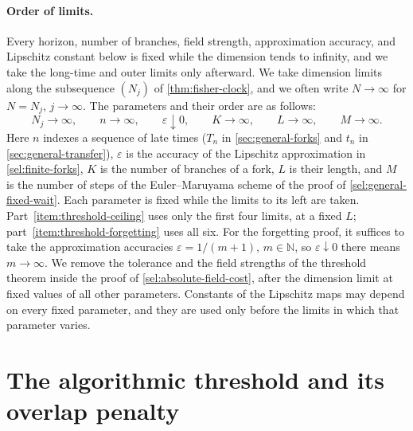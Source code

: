 \paragraph{Order of limits.}
Every horizon, number of branches, field strength, approximation accuracy,
and Lipschitz constant below is fixed while the dimension tends to
infinity, and we take the long-time and outer limits only afterward.
We take dimension limits along the subsequence $(N_j)$ of
\cref{thm:fisher-clock}, and we often write $N\to\infty$ for $N=N_j$,
$j\to\infty$. The parameters and their order are as follows:
\begin{equation}\label{sel:aging-limit-order}
 N_j\to\infty,\qquad n\to\infty,\qquad \varepsilon\downarrow0,\qquad
 K\to\infty,\qquad L\to\infty,\qquad M\to\infty.
\end{equation}
Here $n$ indexes a sequence of late times ($T_n$ in
\cref{sec:general-forks} and $t_n$ in \cref{sec:general-transfer}),
$\varepsilon$ is the accuracy of the Lipschitz approximation in
\cref{sel:finite-forks}, $K$ is the number of branches of a fork, $L$ is
their length, and $M$ is the number of steps of the Euler--Maruyama scheme of
the proof of \cref{sel:general-fixed-wait}. Each parameter is fixed while the limits to its
left are taken. Part~\ref{item:threshold-ceiling} uses only the first four
limits, at a fixed $L$; part~\ref{item:threshold-forgetting} uses all six.
For the forgetting proof, it suffices to take the approximation accuracies
$\varepsilon=1/(m+1)$, $m\in\mathbb N$, so $\varepsilon\downarrow0$ there
means $m\to\infty$.
We remove the tolerance and the field strengths of the threshold theorem
inside the proof of \cref{sel:absolute-field-cost}, after the dimension
limit at fixed values of all other parameters. Constants of the Lipschitz
maps may depend on every fixed parameter, and they are used only before the
limits in which that parameter varies.

\section{The algorithmic threshold and its overlap penalty}
\label{sec:general-field-threshold}

